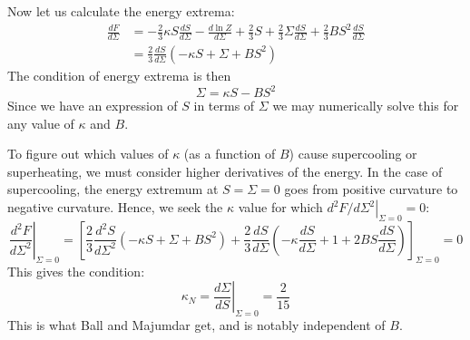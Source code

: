 \documentclass[reqno]{article}
\begin{document}
    Now let us calculate the energy extrema:
    \begin{equation} \label{eq:energy-derivative}
    \begin{split}
        \frac{dF}{d\Sigma}
        &=
        -\frac23 \kappa S \frac{dS}{d\Sigma}
        - \frac{d \ln Z}{d \Sigma}
        + \frac23 S
        + \frac23 \Sigma \frac{dS}{d\Sigma}
        + \frac23 B S^2 \frac{d S}{d\Sigma} \\
        &=
        \frac23 \frac{dS}{d\Sigma} \left(
            -\kappa S + \Sigma + B S^2
        \right)
    \end{split}
    \end{equation}
    The condition of energy extrema is then
    \begin{equation} \label{eq:energy-extremum-condition}
        \Sigma
        =
        \kappa S - B S^2
    \end{equation}
    Since we have an expression of $S$ in terms of $\Sigma$ we may numerically solve this for any value of $\kappa$ and $B$.

    To figure out which values of $\kappa$ (as a function of $B$) cause supercooling or superheating, we must consider higher derivatives of the energy.
    In the case of supercooling, the energy extremum at $S = \Sigma = 0$ goes from positive curvature to negative curvature.
    Hence, we seek the $\kappa$ value for which $\left. d^2F/d\Sigma^2 \right|_{\Sigma = 0} = 0$:
    \begin{equation} \label{eq:second-energy-derivative}
        \left. \frac{d^2 F}{d\Sigma^2} \right|_{\Sigma = 0}
        =
        \left[
            \frac23 \frac{d^2 S}{d \Sigma^2} \left( -\kappa S + \Sigma + BS^2 \right)
            + \frac23 \frac{dS}{d \Sigma} \left( -\kappa \frac{dS}{d\Sigma} + 1 + 2BS \frac{dS}{d\Sigma} \right)
        \right]_{\Sigma = 0}
        =
        0
    \end{equation}
    This gives the condition:
    \begin{equation}
        \kappa_N
        =
        \left. \frac{d\Sigma}{dS} \right|_{\Sigma = 0}
        =
        \frac{2}{15}
    \end{equation}
    This is what Ball and Majumdar get, and is notably independent of $B$.
\end{document}
